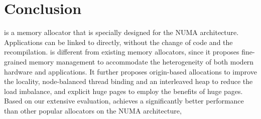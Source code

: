 \section{Conclusion}
\label{sec:conclusion}

\NM{} is a memory allocator that is specially designed for the NUMA architecture. Applications can be linked to \NM{} directly, without the change of code and the recompilation. \NM{} is different from existing memory allocators, since it proposes fine-grained memory management to accommodate the heterogeneity of both modern hardware and applications. It further proposes origin-based allocations to improve the locality, node-balanced thread binding and an interleaved heap to reduce the load imbalance, and explicit huge pages to employ the benefits of huge pages. 
Based on our extensive evaluation, \NM{} achieves a significantly better performance than other popular allocators on the NUMA architecture, 
